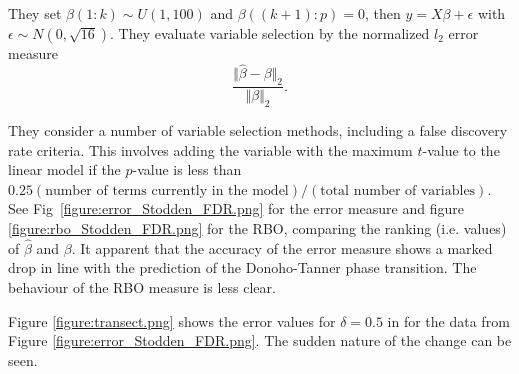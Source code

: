\documentclass[11pt]{article}
\begin{document}
They set $\beta(1:k) \sim U(1,100)$ and $\beta((k+1):p) =0$, then $y= X\beta + \epsilon$ with
$\epsilon \sim N(0,\sqrt{16})$. They evaluate variable selection by the normalized $l_2$ error measure
$$\frac{\Vert\hat{\beta}-\beta\Vert_2}{\Vert\beta\Vert_2}.$$

They consider a number of variable selection methods, including a false discovery rate criteria. This involves adding
the variable with the maximum $t$-value to the linear model if the $p$-value is less than
$0.25(\text{number of terms currently in the model})/(\text{total number of variables})$.  See
Fig~\ref{figure:error_Stodden_FDR.png} for the error measure and figure \ref{figure:rbo_Stodden_FDR.png} for the RBO,
comparing the ranking (i.e. values) of $\hat{\beta}$ and $\beta$. It apparent that the accuracy of the  error measure
shows a marked drop in line with the prediction of the Donoho-Tanner phase transition. The behaviour of the RBO measure
is less clear.

Figure \ref{figure:transect.png} shows the error values for $\delta=0.5$ in for the data from Figure
\ref{figure:error_Stodden_FDR.png}. The sudden nature of the change can be seen.
\end{document}
